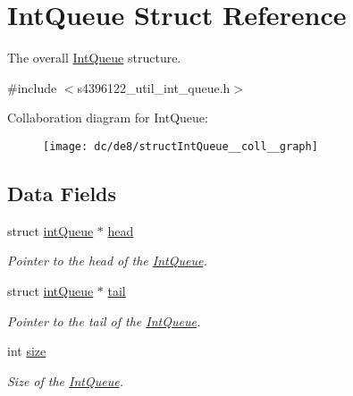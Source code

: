 \hypertarget{structIntQueue}{}\section{Int\+Queue Struct Reference}
\label{structIntQueue}


The overall \hyperlink{structIntQueue}{Int\+Queue} structure.  




{\ttfamily \#include $<$s4396122\+\_\+util\+\_\+int\+\_\+queue.\+h$>$}



Collaboration diagram for Int\+Queue\+:\nopagebreak
\begin{figure}[H]
\begin{center}
\leavevmode
\texttt{[image: dc/de8/structIntQueue\_\_coll\_\_graph]}
\end{center}
\end{figure}
\subsection*{Data Fields}
\begin{DoxyCompactItemize}
\item 
struct \hyperlink{structintQueue}{int\+Queue} $\ast$ \hyperlink{structIntQueue_ad10186fedb5ed17c0e225f9ceeb24c04}{head}\hypertarget{structIntQueue_ad10186fedb5ed17c0e225f9ceeb24c04}{}\label{structIntQueue_ad10186fedb5ed17c0e225f9ceeb24c04}

\begin{DoxyCompactList}\small\item\em Pointer to the head of the \hyperlink{structIntQueue}{Int\+Queue}. \end{DoxyCompactList}\item 
struct \hyperlink{structintQueue}{int\+Queue} $\ast$ \hyperlink{structIntQueue_aed5a99ff57f509c35952f0a3499aa77e}{tail}\hypertarget{structIntQueue_aed5a99ff57f509c35952f0a3499aa77e}{}\label{structIntQueue_aed5a99ff57f509c35952f0a3499aa77e}

\begin{DoxyCompactList}\small\item\em Pointer to the tail of the \hyperlink{structIntQueue}{Int\+Queue}. \end{DoxyCompactList}\item 
int \hyperlink{structIntQueue_a723612c1e494877450388082f5b65fc4}{size}\hypertarget{structIntQueue_a723612c1e494877450388082f5b65fc4}{}\label{structIntQueue_a723612c1e494877450388082f5b65fc4}

\begin{DoxyCompactList}\small\item\em Size of the \hyperlink{structIntQueue}{Int\+Queue}. \end{DoxyCompactList}\end{DoxyCompactItemize}


